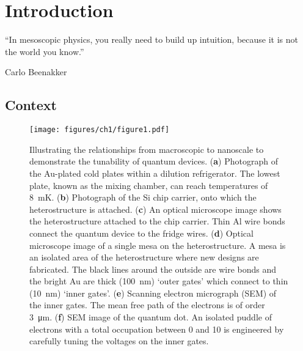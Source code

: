 \chapter{Introduction}\label{cha:intro}
\epigraph{``In mesoscopic physics, you really need to build up intuition, because it is not the world you know.''}{Carlo Beenakker~\cite{beenaker_quote}}



\section{Context}

\begin{figure}[!htb]
 \begin{center}
 \texttt{[image: figures/ch1/figure1.pdf]}
 \caption[Fridge to Quantum Dot Scale Illustration]{\label{fig:ch1/scale_breakdown} 
Illustrating the relationships from macroscopic to nanoscale to demonstrate the tunability of quantum devices. (\textbf{a}) Photograph of the Au-plated cold plates within a dilution refrigerator. The lowest plate, known as the mixing chamber, can reach temperatures of \qty{8}{mK}. (\textbf{b}) Photograph of the Si chip carrier, onto which the heterostructure is attached. (\textbf{c}) An optical microscope image shows the heterostructure attached to the chip carrier. Thin Al wire bonds connect the quantum device to the fridge wires. (\textbf{d}) Optical microscope image of a single mesa on the heterostructure. A mesa is an isolated area of the heterostructure where new designs are fabricated. The black lines around the outside are wire bonds and the bright Au are thick (\qty{100}{nm}) `outer gates' which connect to thin (\qty{10}{nm}) `inner gates'. (\textbf{e}) Scanning electron micrograph (SEM) of the inner gates. The mean free path of the electrons is of order \qty{3}{\micro m}. (\textbf{f}) SEM image of the quantum dot. An isolated puddle of electrons with a total occupation between 0 and 10 is engineered by carefully tuning the voltages on the inner gates. 
}
 \end{center}
\end{figure}




